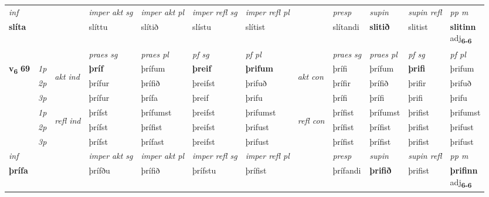 \begin{longtable}[l]{X>{\footnotesize\itshape}llXXXXlXXXX}
   {\textit{inf}} & &  & \textit{imper akt sg} & \textit{imper akt pl} & \textit{imper refl sg} & \textit{imper refl pl} && \textit{presp} & \textit{supin} & \textit{supin refl} & \textit{pp m} \\*
  {\textbf{slíta}} & && slíttu  & slítið & slístu & slítist && slítandi &  \textbf{slitið} & slitist & \specialcell{\textbf{slitinn} \\ adj\textbf{\textsubscript{6-6}}} \\*

\midrule

 & &   & \textit{praes sg}  & \textit{praes pl}    & \textit{ pf sg} & \textit{pf pl} & & \textit{praes sg}  & \textit{praes pl}    & \textit{pf sg} & \textit{pf pl }  \\ \cmidrule{4-7} \cmidrule{9-12}
 \multirow{2}{*}{{{\textbf{v{\textsubscript{6}}} \Large{\textbf{69}}}}}  & 1p & \multirow{3}{*}{\begin{turn}{90}\textit{akt ind}\end{turn}} & \textbf{þríf} & þrífum & \textbf{þreif} & \textbf{þrifum} & \multirow{3}{*}{\begin{turn}{90}\textit{akt con}\end{turn}} &þrífi & þrífum & \textbf{þrifi} & þrifum\\*
 & 2p &  &  þrífur  & þrífið & þreifst & þrifuð & & þrífir & þrífið & þrifir & þrifuð \\*
 & 3p &  & þrífur & þrífa & þreif & þrifu & & þrífi & þrífi& þrifi & þrifu \\*
\cmidrule{4-7} \cmidrule{9-12}
 & 1p & \multirow{3}{*}{\begin{turn}{90}\textit{refl ind}\end{turn}}  & þrífst & þrífumst & þreifst & þrifumst & \multirow{3}{*}{\begin{turn}{90}\textit{refl con}\end{turn}}  &þrífist & þrífumst & þrifist & þrifumst \\*
 & 2p &  & þrífst & þrífist & þreifst & þrifust & &þrífist & þrífist & þrifist & þrifust \\*
 & 3p  & & þrífst & þrífast & þreifst & þrifust & & þrífist & þrífist& þrifist & þrifust \\*
\cmidrule{4-7} \cmidrule{9-12}

   {\textit{inf}} & &  & \textit{imper akt sg} & \textit{imper akt pl} & \textit{imper refl sg} & \textit{imper refl pl} && \textit{presp} & \textit{supin} & \textit{supin refl} & \textit{pp m} \\*
  {\textbf{þrífa}} & && þrífðu  & þrífið & þrífstu & þrífist && þrífandi &  \textbf{þrifið} & þrifist & \specialcell{\textbf{þrifinn} \\ adj\textbf{\textsubscript{6-6}}} \\*


\end{longtable}
